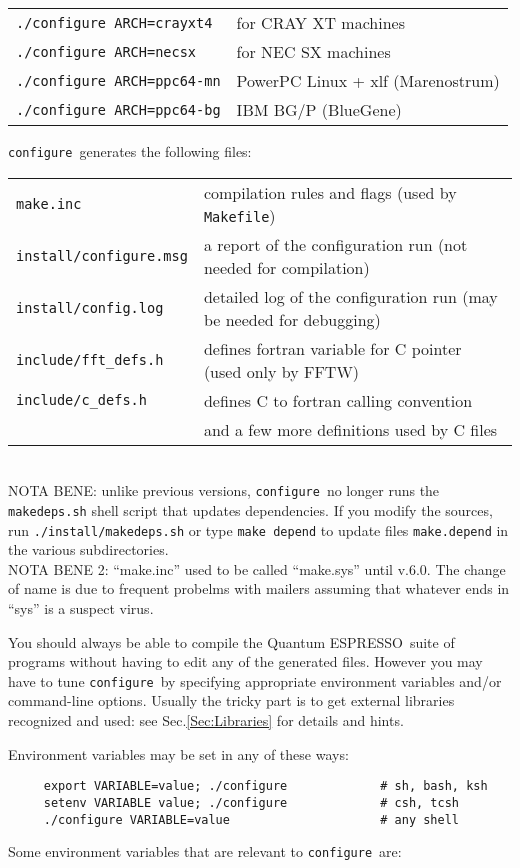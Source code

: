 \documentclass[12pt,a4paper]{article}
\def\qe{{\sc Quantum ESPRESSO}}
\def\configure{\texttt{configure}}
\begin{document}
\begin{tabular}{ll}
    \texttt{./configure ARCH=crayxt4}& for CRAY XT machines \\
    \texttt{./configure ARCH=necsx}   & for NEC SX machines \\
    \texttt{./configure ARCH=ppc64-mn}& PowerPC Linux + xlf (Marenostrum) \\
    \texttt{./configure ARCH=ppc64-bg}& IBM BG/P (BlueGene)
\end{tabular}

\noindent \configure\ generates the following files:

\begin{tabular}{ll}
\texttt{make.inc} &      compilation rules and flags (used by \texttt{Makefile})\\
\texttt{install/configure.msg} & a report of the configuration run (not needed for compilation)\\
\texttt{install/config.log} & detailed log of the configuration run (may be needed for debugging)\\
\texttt{include/fft\_defs.h} &    defines fortran variable for C pointer (used only by FFTW)\\
\texttt{include/c\_defs.h} &      defines C to fortran calling convention\\
                           & and a few more definitions used by C files\\
\end{tabular}\\
NOTA BENE: unlike previous versions, \configure\ no longer runs the
\texttt{makedeps.sh} shell script that updates dependencies. If you modify the
sources, run \texttt{./install/makedeps.sh} or type \texttt{make depend}
to update files \texttt{make.depend} in the various subdirectories.\\
NOTA BENE 2: ``make.inc'' used to be called ``make.sys'' until v.6.0. The
change of name is due to frequent probelms with mailers assuming that
whatever ends in ``sys'' is a suspect virus.

You should always be able to compile the \qe\ suite
of programs without having to edit any of the generated files. However you
may have to tune \configure\ by specifying appropriate environment variables
and/or command-line options. Usually the tricky part is to get external
libraries recognized and used: see Sec.\ref{Sec:Libraries}
for details and hints.

Environment variables may be set in any of these ways:
\begin{verbatim}
     export VARIABLE=value; ./configure             # sh, bash, ksh
     setenv VARIABLE value; ./configure             # csh, tcsh
     ./configure VARIABLE=value                     # any shell
\end{verbatim}
Some environment variables that are relevant to \configure\ are:
\end{document}
